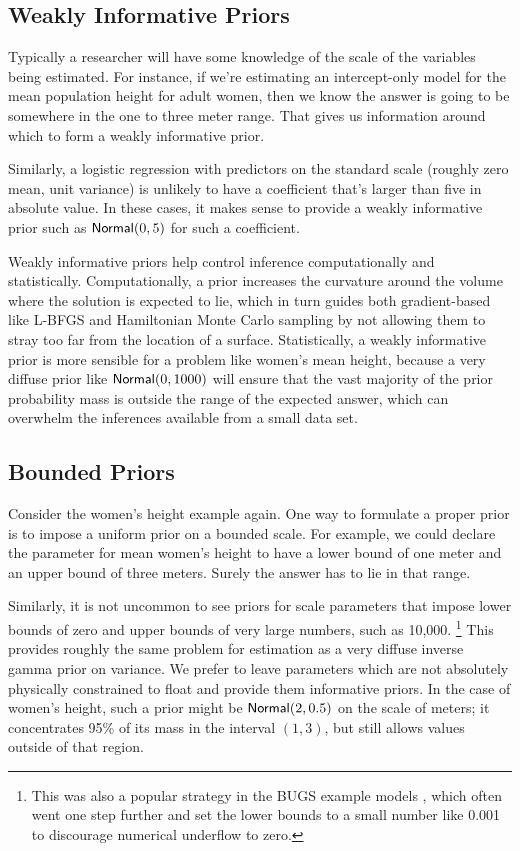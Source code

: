 \subsection{Weakly Informative Priors}

Typically a researcher will have some knowledge of the scale of the
variables being estimated.  For instance, if we're estimating an
intercept-only model for the mean population height for adult women,
then we know the answer is going to be somewhere in the one to three
meter range.  That gives us information around which to form a weakly
informative prior.

Similarly, a logistic regression with predictors on the standard scale
(roughly zero mean, unit variance) is unlikely to have a
coefficient that's larger than five in absolute value.  In these
cases, it makes sense to provide a weakly informative prior such as
$\distro{Normal}(0,5)$ for such a coefficient.

Weakly informative priors help control inference computationally and
statistically.  Computationally, a prior increases the curvature
around the volume where the solution is expected to lie, which in turn
guides both gradient-based like L-BFGS and Hamiltonian Monte Carlo
sampling by not allowing them to stray too far from the location of a
surface.  Statistically, a weakly informative prior is more sensible
for a problem like women's mean height, because a very diffuse prior
like $\distro{Normal}(0,1000)$ will ensure that the vast majority of
the prior probability mass is outside the range of the expected
answer, which can overwhelm the inferences available from a small data
set.

\subsection{Bounded Priors}

Consider the women's height example again.  One way to formulate a
proper prior is to impose a uniform prior on a bounded scale.  For
example, we could declare the parameter for mean women's height to
have a lower bound of one meter and an upper bound of three meters.
Surely the answer has to lie in that range.  

Similarly, it is not uncommon to see priors for scale parameters that
impose lower bounds of zero and upper bounds of very large numbers,
such as 10,000.%
%
\footnote{This was also a popular strategy in the BUGS example models
  \citep{LunnEtAl:2012}, which often went one step further and set the
  lower bounds to a small number like 0.001 to discourage numerical
  underflow to zero.}
%
This provides roughly the same problem for estimation as a very
diffuse inverse gamma prior on variance.  We prefer to leave
parameters which are not absolutely physically constrained to float
and provide them informative priors.  In the case of women's height,
such a prior might be $\distro{Normal}(2,0.5)$ on the scale of meters;
it concentrates 95\% of its mass in the interval $(1,3)$, but still
allows values outside of that region.

